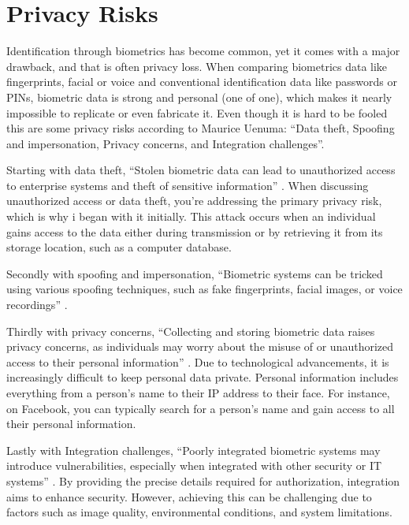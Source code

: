\documentclass[conference]{IEEEtran}
\begin{document}
\section{Privacy Risks}

Identification through biometrics has become common, yet it comes with a major drawback, and that is often privacy loss. When comparing biometrics data like fingerprints, facial or voice and conventional identification data like passwords or PINs, biometric data is strong and personal (one of one), which makes it nearly impossible to replicate or even fabricate it. Even though it is hard to be fooled this are some privacy risks according to Maurice Uenuma: ``Data theft, Spoofing and impersonation, Privacy concerns, and Integration challenges''. \cite{uenuma_biometric_risks}

Starting with data theft, ``Stolen biometric data can lead to unauthorized access to enterprise systems and theft of sensitive information'' \cite{uenuma_biometric_risks}. When discussing unauthorized access or data theft, you're addressing the primary privacy risk, which is why i began with it initially. This attack occurs when an individual gains access to the data either during transmission or by retrieving it from its storage location, such as a computer database.

Secondly with spoofing and impersonation, ``Biometric systems can be tricked using various spoofing techniques, such as fake fingerprints, facial images, or voice recordings'' \cite{uenuma_biometric_risks}.

Thirdly with privacy concerns, ``Collecting and storing biometric data raises privacy concerns, as individuals may worry about the misuse of or unauthorized access to their personal information'' \cite{uenuma_biometric_risks}. Due to technological advancements, it is increasingly difficult to keep personal data private.
Personal information includes everything from a person's name to their IP address to their face. For instance, on Facebook, you can typically search for a person's name and gain access to all their personal information.

Lastly with Integration challenges, ``Poorly integrated biometric systems may introduce vulnerabilities, especially when integrated with other security or IT systems'' \cite{uenuma_biometric_risks}. By providing the precise details required for authorization, integration aims to enhance security. However, achieving this can be challenging due to factors such as image quality, environmental conditions, and system limitations.
\end{document}
